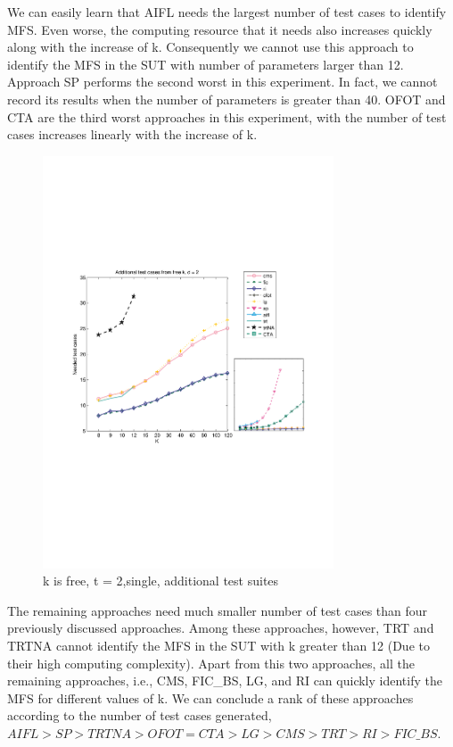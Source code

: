 \documentclass{sig-alternate-05-2015}
\begin{document}
{{We can easily learn that AIFL needs the largest number of test cases to identify MFS. Even worse, the computing resource that it needs also increases quickly along with the increase of k. Consequently we cannot use this approach to identify the MFS in the SUT with number of parameters larger than 12. Approach SP performs the second worst in this experiment. In fact, we cannot record its results when the number of parameters is greater than 40. OFOT and CTA are the third worst approaches in this experiment, with the number of test cases increases linearly with the increase of k.

\begin{figure}
 \centering
 \includegraphics[width=3.4in]{cpp.pdf}
 \caption{k is free, t = 2,single, additional test suites}
 \label{fig_free_k}
\end{figure}

The remaining approaches need much smaller number of test cases than four previously discussed approaches. Among these approaches, however, TRT and TRTNA cannot identify the MFS in the SUT with k greater than 12 (Due to their high computing complexity). Apart from this two approaches, all the remaining approaches, i.e., CMS, FIC\_BS, LG, and RI can quickly identify the MFS for different values of k. We can conclude a rank of these approaches according to the number of test cases generated, $AIFL > SP > TRTNA > OFOT = CTA > LG > CMS > TRT > RI > FIC\_BS$.


}}
\end{document}

